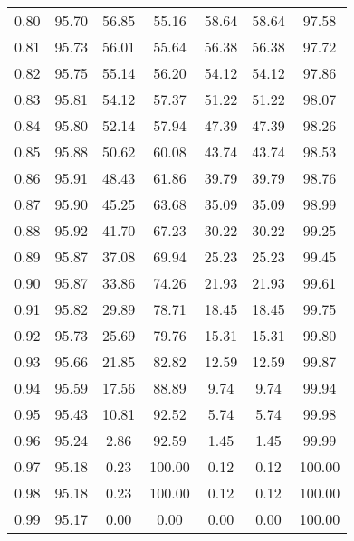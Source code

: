 \begin{tabular}{|c|c|c|c|c|c|c|}
      0.80 &     95.70 &     56.85 &      55.16 &   58.64 &      58.64 &         97.58 \\
      0.81 &     95.73 &     56.01 &      55.64 &   56.38 &      56.38 &         97.72 \\
      0.82 &     95.75 &     55.14 &      56.20 &   54.12 &      54.12 &         97.86 \\
      0.83 &     95.81 &     54.12 &      57.37 &   51.22 &      51.22 &         98.07 \\
      0.84 &     95.80 &     52.14 &      57.94 &   47.39 &      47.39 &         98.26 \\
      0.85 &     95.88 &     50.62 &      60.08 &   43.74 &      43.74 &         98.53 \\
      0.86 &     95.91 &     48.43 &      61.86 &   39.79 &      39.79 &         98.76 \\
      0.87 &     95.90 &     45.25 &      63.68 &   35.09 &      35.09 &         98.99 \\
      0.88 &     95.92 &     41.70 &      67.23 &   30.22 &      30.22 &         99.25 \\
      0.89 &     95.87 &     37.08 &      69.94 &   25.23 &      25.23 &         99.45 \\
      0.90 &     95.87 &     33.86 &      74.26 &   21.93 &      21.93 &         99.61 \\
      0.91 &     95.82 &     29.89 &      78.71 &   18.45 &      18.45 &         99.75 \\
      0.92 &     95.73 &     25.69 &      79.76 &   15.31 &      15.31 &         99.80 \\
      0.93 &     95.66 &     21.85 &      82.82 &   12.59 &      12.59 &         99.87 \\
      0.94 &     95.59 &     17.56 &      88.89 &    9.74 &       9.74 &         99.94 \\
      0.95 &     95.43 &     10.81 &      92.52 &    5.74 &       5.74 &         99.98 \\
      0.96 &     95.24 &      2.86 &      92.59 &    1.45 &       1.45 &         99.99 \\
      0.97 &     95.18 &      0.23 &     100.00 &    0.12 &       0.12 &        100.00 \\
      0.98 &     95.18 &      0.23 &     100.00 &    0.12 &       0.12 &        100.00 \\
      0.99 &     95.17 &      0.00 &       0.00 &    0.00 &       0.00 &        100.00 \\
\bottomrule
\end{tabular}
